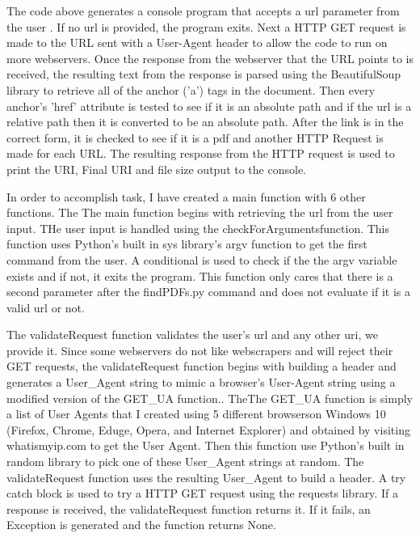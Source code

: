 \documentclass[12pt]{article}
\begin{document}
The code above generates a console program that accepts a url parameter from the user . If no url is provided, the program exits. Next a HTTP GET request is made to the URL sent with a  User-Agent header to allow the code to run on more webservers.
Once the response from the webserver that the URL points to is received, the resulting text from the response is parsed using the BeautifulSoup library to retrieve all of the anchor ('a') tags in the document. Then every anchor's 'href' attribute is tested to see if it is an absolute path and if the url is a relative path then it is converted to be an absolute path. After the link is in the correct form, it is checked to see if it is a pdf and another HTTP Request is made for each URL. The resulting response from the HTTP request is used to print the URI, Final URI and file size output to the console. 

In order to accomplish task, I have created a main function with 6 other functions. The The main function begins with retrieving the url  from the user input. THe user input is handled using the checkForArgumentsfunction. This function uses Python's built in sys library's argv function to get the first command from the user. A conditional is used to check if the the argv variable exists and if not, it exits the program. This function only cares that there is a second parameter after the findPDFs.py command and does not evaluate if it is a valid url or not.

The validateRequest function validates the user's url and any other uri, we provide it. Since some webservers do not like webscrapers and will reject their GET requests, the validateRequest function begins with building a header and generates a User\_Agent string to mimic a browser's User-Agent string using a modified version of the GET\_UA function.\cite{randomizeUserAgent}. TheThe GET\_UA function is simply a list of User Agents that I created using 5 different browserson Windows 10 (Firefox, Chrome, Eduge, Opera, and Internet Explorer) and obtained by visiting whatismyip.com \cite{whatIsMyIp} to get the User Agent. Then this function use Python's built in random library to pick one of these User\_Agent strings at random. The validateRequest function uses the resulting User\_Agent to build a header. A try catch block is used to try a HTTP GET request using the requests library. If a response is received, the validateRequest function returns it.
If it fails, an Exception is generated and the function returns None. 
\end{document}
